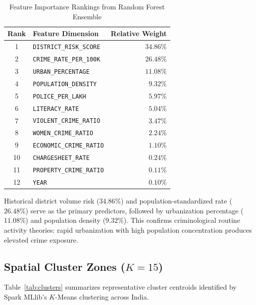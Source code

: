 \documentclass[conference]{IEEEtran}
\begin{document}
\begin{table}[h]
\centering
\caption{Feature Importance Rankings from Random Forest Ensemble}
\label{tab:feat_imp}
\begin{tabular}{clr}
\toprule
\textbf{Rank} & \textbf{Feature Dimension} & \textbf{Relative Weight} \\
\midrule
1 & \texttt{DISTRICT\_RISK\_SCORE} & $34.86\%$ \\
2 & \texttt{CRIME\_RATE\_PER\_100K} & $26.48\%$ \\
3 & \texttt{URBAN\_PERCENTAGE} & $11.08\%$ \\
4 & \texttt{POPULATION\_DENSITY} & $9.32\%$ \\
5 & \texttt{POLICE\_PER\_LAKH} & $5.97\%$ \\
6 & \texttt{LITERACY\_RATE} & $5.04\%$ \\
7 & \texttt{VIOLENT\_CRIME\_RATIO} & $3.47\%$ \\
8 & \texttt{WOMEN\_CRIME\_RATIO} & $2.24\%$ \\
9 & \texttt{ECONOMIC\_CRIME\_RATIO} & $1.10\%$ \\
10 & \texttt{CHARGESHEET\_RATE} & $0.24\%$ \\
11 & \texttt{PROPERTY\_CRIME\_RATIO} & $0.11\%$ \\
12 & \texttt{YEAR} & $0.10\%$ \\
\bottomrule
\end{tabular}
\end{table}

Historical district volume risk ($34.86\%$) and population-standardized rate ($26.48\%$) serve as the primary predictors, followed by urbanization percentage ($11.08\%$) and population density ($9.32\%$). This confirms criminological routine activity theories: rapid urbanization with high population concentration produces elevated crime exposure.

\subsection{Spatial Cluster Zones ($K=15$)}
Table~\ref{tab:clusters} summarizes representative cluster centroids identified by Spark MLlib's $K$-Means clustering across India.
\end{document}
